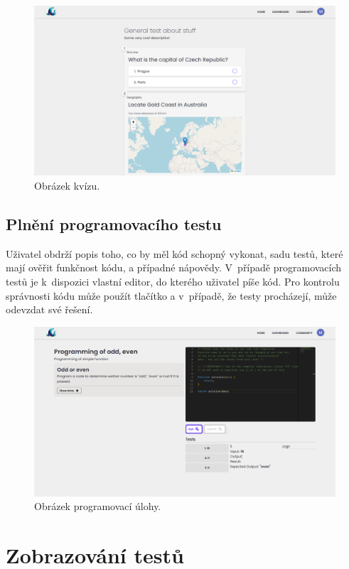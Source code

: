 \documentclass[12pt, a4paper,
openright
]{report}
\begin{document}
\begin{figure}[H]
	\centering %
	\includegraphics[width=0.75\linewidth]{image/test-taking.png} 
	\caption{Obrázek kvízu.} %
	\label{fig:test-taking} %
\end{figure}

\subsection{Plnění programovacího testu}
Uživatel obdrží popis toho, co by měl kód schopný vykonat, sadu testů, které mají ověřit funkčnost kódu, a případné nápovědy. V~případě programovacích testů je k~dispozici vlastní editor, do kterého uživatel píše kód. Pro kontrolu správnosti kódu může použít tlačítko \textit{} a v~případě, že testy procházejí, může odevzdat své řešení.

\begin{figure}[H]
	\centering %
	\includegraphics[width=0.75\linewidth]{image/programming.png} 
	\caption{Obrázek programovací úlohy.} %
	\label{fig:programming} %
\end{figure}

\clearpage
\section{Zobrazování testů}
\end{document}
